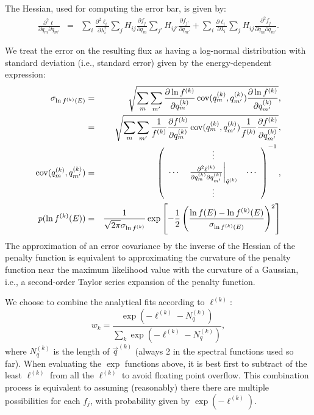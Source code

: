 \documentclass{article}    %
\newcommand{\cov}{\mathop{{\rm cov}}}
\begin{document}
The Hessian, used for computing the error bar, is given by:
\begin{eqnarray}
\frac{\partial^2 \ell}{\partial q_m \partial q_{m'}} &=&
\sum_i \frac{\partial^2 \ell_i}{\partial \lambda_i^2} \sum_j H_{ij} \frac{\partial f_j}{\partial q_m}\sum_{j'} H_{ij'} \frac{\partial f_{j'}}{\partial q_{m'}} +
\sum_i \frac{\partial \ell_i}{\partial \lambda_i} \sum_j H_{ij} \frac{\partial^2 f_j}{\partial q_m \partial q_{m'}}
.
\end{eqnarray}


We treat the error on the resulting flux as having a log-normal
distribution with standard deviation (i.e., standard error) given by
the energy-dependent expression:
\begin{eqnarray}
\sigma_{\ln f^{(k)}(E)} &=& \sqrt{
\sum_m \sum_{m'} \frac{\partial \ln f^{(k)}}{\partial q^{(k)}_m} \cov(q^{(k)}_m,q^{(k)}_{m'}) \frac{\partial \ln f^{(k)}}{\partial q^{(k)}_{m'}} 
}, \nonumber \\
&=& \sqrt{
\sum_m \sum_{m'} \frac{1}{f^{(k)}} \frac{\partial f^{(k)}}{\partial q^{(k)}_m} \cov(q^{(k)}_m,q^{(k)}_{m'}) \frac{1}{f^{(k)}} \frac{\partial f^{(k)}}{\partial q^{(k)}_{m'}} 
}, \\
\cov(q^{(k)}_m,q^{(k)}_{m'}) &=& \left(
\begin{array}{ccc}
~ & \vdots & ~ \\
\cdots & \left.
\frac{\partial^2 \ell^{(k)}}{\partial q^{(k)}_m \partial q^{(k)}_{m'}}
\right|_{\hat{q}^{(k)}}
& \cdots \\
~ & \vdots & ~ 
\end{array}
\right)^{-1}, \\
p(\ln f^{(k)}(E)) &=& \frac{1}{\sqrt{2\pi}\sigma_{\ln f^{(k)}}}\exp\left[
-\frac{1}{2}\left(\frac{\ln f(E) - \ln f^{(k)}(E)}{\sigma_{\ln f^{(k)}(E)}}\right)^2
\right]
\end{eqnarray}
The approximation of an error covariance by the inverse of the Hessian
of the penalty function is equivalent to approximating the curvature
of the penalty function near the maximum likelihood value with the
curvature of a Gaussian, i.e., a second-order Taylor series expansion
of the penalty function.

We choose to combine the analytical fits according to $\ell^{(k)}$:
\begin{equation}
w_k = \frac{\exp(-\ell^{(k)}-N^{(k)}_q)}{\sum_k \exp(-\ell^{(k)}-N^{(k)}_q)},
\end{equation}
where $N^{(k)}_q$ is the length of $\vec{q}^{(k)}$ (always 2 in the
spectral functions used so far).  When evaluating the $\exp$ functions
above, it is best first to subtract of the least $\ell^{(k)}$ from all
the $\ell^{(k)}$ to avoid floating point overflow. This combination
process is equivalent to assuming (reasonably) there there are
multiple possibilities for each $f_j$, with probability given by
$\exp(-\ell^{(k)})$.
\end{document}
